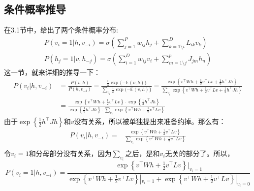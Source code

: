 \documentclass[a4paper]{article}
\begin{document}
\subsection{条件概率推导}
在3.1节中，给出了两个条件概率分布:
\begin{equation}\begin{array}{l}
P\left(v_{i}=1 | h, v_{-i}\right)=\sigma\left(\sum_{j=1}^{P} w_{i j} h_{j}+\sum_{k=1\setminus i}^{D} L_{i k} v_{k}\right) \\
P\left(h_{j}=1 | v, h_{-j}\right)=\sigma\left(\sum_{i=1}^{D} w_{i j} v_{i}+\sum_{m=1\setminus j}^{p} J_{j m} h_{n}\right)
\end{array}\end{equation}
这一节，就来详细的推导一下：
\begin{equation}\begin{aligned}
P\left(v_{i} | h, v_{-i}\right)&=\frac{P(v, h)}{P(h, v_{-i})}=\frac{\frac{1}{Z} \exp \{-\mathbb{E}(v, h)\}}{\sum_{v_i} \frac{1}{Z} \exp (-\mathbb{E}(v, h)\}} = \frac{\exp \left\{v^{\top} W h+\frac{1}{2} v^{\top} L v+\frac{1}{2} h^{\top} J h\right\}}{\sum_{v_{i}} \exp \left\{v^{\top} W h+\frac{1}{2} v^{\top}L v+\frac{1}{2} h^{\top} J h\right\}}\\
&=\frac{\exp \left\{v^{\top} W h+\frac{1}{2} v^{\top} L v\right\} \cdot \exp \left\{\frac{1}{2} h^{\top} J h\right\}}{\exp \left\{\frac{1}{2} h^{\top} J h\right\} \cdot \sum_{v_{i}} \exp \left\{v^{\top} W h+\frac{1}{2} v^{\top} L v\right\}}
\end{aligned}\end{equation}
由于$\exp \left\{\frac{1}{2} h^{\top} J h\right\}$和$v$没有关系，所以被单独提出来准备约掉。那么有：
\begin{equation}
    \begin{split}
        P\left(v_{i} | h, v_{-i}\right) 
        = & \frac{\exp \left\{v^{\top} W h+\frac{1}{2} v^{\top} L v\right\}}{\sum_{v_{i}} \exp \left\{v^{\top} W h+\frac{1}{2} v^{\top} L v\right\}} \\
    \end{split}
\end{equation}
令$v_i=1$和分母部分没有关系，因为$\sum_{v_{i}}$之后，是和$v_{i}$无关的部分了。所以，
\begin{equation}
    P\left(v_{i}=1 | h, v_{-i}\right) =  \frac{\exp \left\{v^{\top} W h+\frac{1}{2} v^{\top} L v\right\}|_{v_i = 1}}{\exp \left\{v^{\top} W h+\frac{1}{2} v^{\top} L v\right\}|_{v_i = 1} + \exp \left\{v^{\top} W h+\frac{1}{2} v^{\top} L v\right\}|_{v_i = 0}}
\end{equation}
\end{document}
